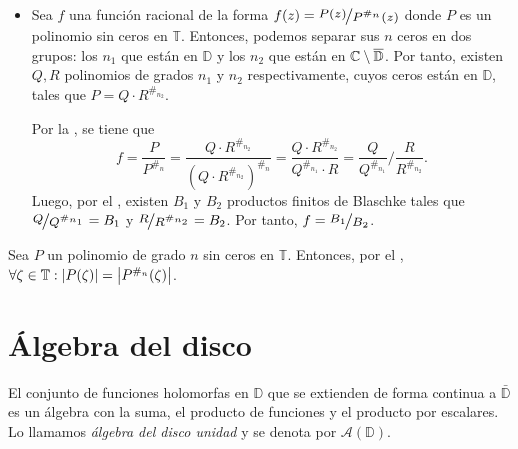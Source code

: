 \begin{dem}
\begin{itemize}[wide, labelindent=0pt]
        \item[$\boxed{\Leftarrow}$] Sea $f$ una función racional de la forma $f(z) = \sfrac{P(z)}{P^{\#_n}(z)}$ donde $P$ es un polinomio sin ceros en $\mathbb{T}$. Entonces, podemos separar sus $n$ ceros en dos grupos: los $n_1$ que están en $\mathbb{D}$ y los $n_2$ que están en $\mathbb{C} \setminus \overline{\mathbb{D}}$. Por tanto, existen $Q, R$ polinomios de grados $n_1$ y $n_2$ respectivamente, cuyos ceros están en $\mathbb{D}$, tales que $P = Q \cdot R^{\#_{n_2}}$.
        
        Por la , se tiene que
        \[
        f = \frac{P}{P^{\#_n}} = \frac{Q \cdot R^{\#_{n_2}}}{\left(Q \cdot R^{\#_{n_2}}\right)^{\#_n}} = \frac{Q \cdot R^{\#_{n_2}}}{Q^{\#_{n_1}} \cdot R} = \frac{Q}{Q^{\#_{n_1}}} \bigg/ \frac{R}{R^{\#_{n_2}}}.
        \]
        Luego, por el , existen $B_1$ y $B_2$ productos finitos de Blaschke tales que $\sfrac{Q}{Q^{\#_{n_1}}} = B_1$ y $\sfrac{R}{R^{\#_{n_2}}} = B_2$. Por tanto, $f = \sfrac{B_1}{B_2}$.\hfill\qedsymbol

    \end{itemize}
\end{dem}

\begin{obs}
    Sea $P$ un polinomio de grado $n$ sin ceros en $\mathbb{T}$. Entonces, por el ,
    $\forall \zeta \in \mathbb{T} : \left|P(\zeta)\right| = \left|P^{\#_n}(\zeta)\right|$.
\end{obs}

\section{Álgebra del disco}

\begin{defn}\label{defn:algebra-disco-unidad}
    El conjunto de funciones holomorfas en $\mathbb{D}$ que se extienden de forma continua a $\bar{\mathbb{D}}$ es un álgebra con la suma, el producto de funciones y el producto por escalares. Lo llamamos \emph{álgebra del disco unidad} y se denota por $\mathscr{A}(\mathbb{D})$.
\end{defn}

